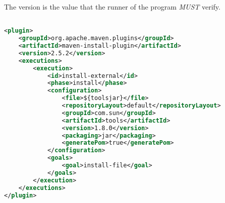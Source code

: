 The version is the value that the runner of the program \emph{MUST} verify.
\begin{lstlisting}[language=XML,caption={How to 'mvn install' the tools.jar},label={lst:instToolsJar}]% Start your code-block

<plugin>
	<groupId>org.apache.maven.plugins</groupId>
	<artifactId>maven-install-plugin</artifactId>
	<version>2.5.2</version>
	<executions>
		<execution>
			<id>install-external</id>
			<phase>install</phase>
			<configuration>
				<file>${toolsjar}</file>
				<repositoryLayout>default</repositoryLayout>
				<groupId>com.sun</groupId>
				<artifactId>tools</artifactId>
				<version>1.8.0</version>
				<packaging>jar</packaging>
				<generatePom>true</generatePom>
			</configuration>
			<goals>
				<goal>install-file</goal>
			</goals>
		</execution>
	</executions>
</plugin>
\end{lstlisting}







































